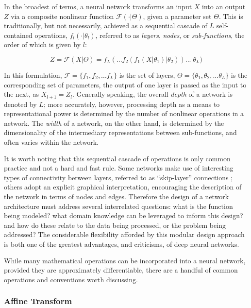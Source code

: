 In the broadest of terms, a neural network transforms an input $X$ into an output $Z$ via a composite nonlinear function $\mathcal{F}(\cdot \vert \Theta)$, given a parameter set $\Theta$.
This is traditionally, but not necessarily, achieved as a sequential cascade of $L$ self-contained operations, $f_l(\cdot \vert \theta_l)$, referred to as \emph{layers}, \emph{nodes}, or \emph{sub-functions}, the order of which is given by $l$:

\begin{equation}
\label{eq:layers}
Z = \mathcal{F}(X \vert \Theta) = f_{L}(  ... f_2(f_1(X \vert \theta_1) \vert \theta_2) ) ... \vert \theta_{L})
\end{equation}

\noindent In this formulation, $\mathcal{F} = \{f_1, f_2, ... f_{L} \}$ is the set of layers, $\Theta = \{\theta_1, \theta_2, ... \theta_{L} \}$ is the corresponding set of parameters, the output of one layer is passed as the input to the next, as $X_{l+1} = Z_{l}$.
Generally speaking, the overall \emph{depth} of a network is denoted by $L$;
more accurately, however, processing depth as a means to representational power is determined by the number of nonlinear operations in a network.
The \emph{width} of a network, on the other hand, is determined by the dimensionality of the intermediary representations between sub-functions, and often varies within the network.

It is worth noting that this sequential cascade of operations is only common practice and not a hard and fast rule.
Some networks make use of interesting types of connectivity between layers, referred to as ``skip-layer'' connections \cite{};
others adopt an explicit graphical interpretation, encouraging the description of the network in terms of nodes and edges.
Therefore the design of a network architecture must address several interrelated questions:
what is the function being modeled?
what domain knowledge can be leveraged to inform this design?
and how do these relate to the data being processed, or the problem being addressed?
The considerable flexibility afforded by this modular design approach is both one of the greatest advantages, and criticisms, of deep neural networks.

While many mathematical operations can be incorporated into a neural network, provided they are approximately differentiable, there are a handful of common operations and conventions worth discussing.

\subsubsection{Affine Transform}

